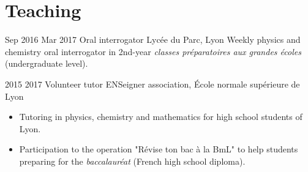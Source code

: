 \documentclass[letterpaper]{cvtemplate} %
\begin{document}
\section{Teaching}
\begin{cvbody}

\cvitem
	{Sep 2016}
	{Mar 2017}
	{Oral interrogator}
	{Lyc\'ee du Parc, Lyon }
	{}
	{}
	{Weekly physics and chemistry oral interrogator in 2nd-year \textit{classes pr\'eparatoires aux grandes \'ecoles} (undergraduate level).\\}
	
\cvitem
	{2015}
	{2017}
	{Volunteer tutor}
	{ENSeigner association, \'Ecole normale sup\'erieure de Lyon }
	{}
	{}
	{\begin{itemize}
		\item Tutoring in physics, chemistry and mathematics for high school students of Lyon.
		\item Participation to the operation "R\'evise ton bac \`a la BmL" to help students preparing for the \textit{baccalaur\'eat} (French high school diploma).
	\end{itemize}}

\end{cvbody}
\end{document}
